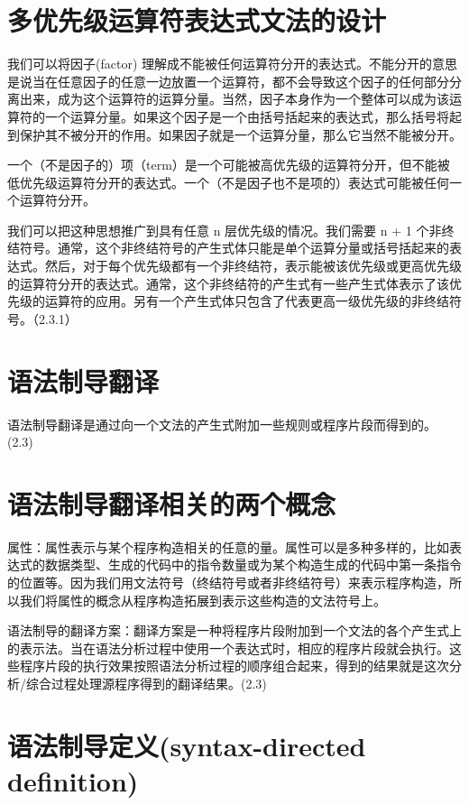 \documentclass[12pt]{article}
\begin{document}
\section*{多优先级运算符表达式文法的设计}

我们可以将因子(factor) 理解成不能被任何运算符分开的表达式。不能分开的意思是说当在任意因子的任意一边放置一个运算符，都不会导致这个因子的任何部分分离出来，成为这个运算符的运算分量。当然，因子本身作为一个整体可以成为该运算符的一个运算分量。如果这个因子是一个由括号括起来的表达式，那么括号将起到保护其不被分开的作用。如果因子就是一个运算分量，那么它当然不能被分开。

一个（不是因子的）项（term）是一个可能被高优先级的运算符分开，但不能被低优先级运算符分开的表达式。一个（不是因子也不是项的）表达式可能被任何一个运算符分开。

我们可以把这种思想推广到具有任意 n 层优先级的情况。我们需要 n + 1 个非终结符号。通常，这个非终结符号的产生式体只能是单个运算分量或括号括起来的表达式。然后，对于每个优先级都有一个非终结符，表示能被该优先级或更高优先级的运算符分开的表达式。通常，这个非终结符的产生式有一些产生式体表示了该优先级的运算符的应用。另有一个产生式体只包含了代表更高一级优先级的非终结符号。（2.3.1）


\section*{语法制导翻译}

语法制导翻译是通过向一个文法的产生式附加一些规则或程序片段而得到的。(2.3)


\section*{语法制导翻译相关的两个概念}

属性：属性表示与某个程序构造相关的任意的量。属性可以是多种多样的，比如表达式的数据类型、生成的代码中的指令数量或为某个构造生成的代码中第一条指令的位置等。因为我们用文法符号（终结符号或者非终结符号）来表示程序构造，所以我们将属性的概念从程序构造拓展到表示这些构造的文法符号上。

语法制导的翻译方案：翻译方案是一种将程序片段附加到一个文法的各个产生式上的表示法。当在语法分析过程中使用一个表达式时，相应的程序片段就会执行。这些程序片段的执行效果按照语法分析过程的顺序组合起来，得到的结果就是这次分析/综合过程处理源程序得到的翻译结果。(2.3)


\section*{语法制导定义(syntax-directed definition)}
\end{document}
